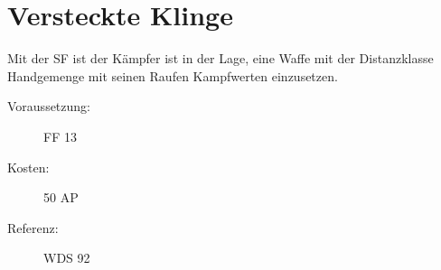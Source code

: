 \section{Versteckte Klinge}
\label{sf.versteckte_klinge}
Mit der SF  ist der Kämpfer ist in der Lage, eine Waffe mit der Distanzklasse Handgemenge mit seinen Raufen Kampfwerten einzusetzen.
\begin{description}
    \item[Voraussetzung:]
        FF 13
    \item [Kosten:]
        50 AP
    \item [Referenz:]
        WDS 92
\end{description}

